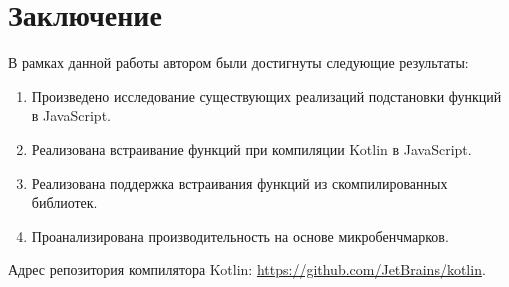\section*{Заключение}

В рамках данной работы автором были достигнуты следующие
результаты:
\begin{enumerate}
  \item Произведено исследование существующих реализаций подстановки
  функций в JavaScript.
  \item Реализована встраивание функций при компиляции Kotlin в JavaScript.
  \item Реализована поддержка встраивания функций из скомпилированных библиотек.
  \item Проанализирована производительность на основе микробенчмарков.
\end{enumerate}

Адрес репозитория компилятора Kotlin: \url{https://github.com/JetBrains/kotlin}.
